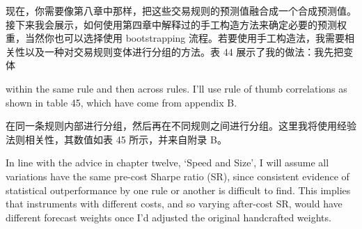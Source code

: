 \begin{chineseblock}现在，你需要像第八章中那样，把这些交易规则的预测值融合成一个合成预测值。接下来我会展示，如何使用第四章中解释过的手工构造方法来确定必要的预测权重，当然你也可以选择使用 bootstrapping 流程。若要使用手工构造法，我需要相关性以及一种对交易规则变体进行分组的方法。表 44 展示了我的做法：我先把变体\end{chineseblock}

\bipairgap

\begin{englishblock} within the same rule and then across rules. I'll use rule of thumb correlations as shown in table 45, which have come from appendix B. \end{englishblock}

\begin{chineseblock}在同一条规则内部进行分组，然后再在不同规则之间进行分组。这里我将使用经验法则相关性，其数值如表 45 所示，并来自附录 B。 \end{chineseblock}

\begin{bilingualtableblock} 
\end{bilingualtableblock}

\begin{englishblock} In line with the advice in chapter twelve, ‘Speed and Size’, I will assume all variations have the same pre-cost Sharpe ratio (SR), since consistent evidence of statistical outperformance by one rule or another is difficult to find. This implies that instruments with different costs, and so varying after-cost SR, would have different forecast weights once I'd adjusted the original handcrafted weights. \end{englishblock}

